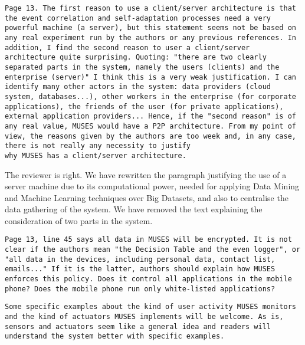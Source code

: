 \documentclass[preprint]{elsarticle}
\begin{document}
{\begin{verbatim}
Page 13. The first reason to use a client/server architecture is that
the event correlation and self-adaptation processes need a very
powerful machine (a server), but this statement seems not be based on
any real experiment run by the authors or any previous references. In
addition, I find the second reason to user a client/server
architecture quite surprising. Quoting: "there are two clearly
separated parts in the system, namely the users (clients) and the
enterprise (server)" I think this is a very weak justification. I can
identify many other actors in the system: data providers (cloud
system, databases...), other workers in the enterprise (for corporate
applications), the friends of the user (for private applications),
external application providers... Hence, if the "second reason" is of
any real value, MUSES would have a P2P architecture. From my point of
view, the reasons given by the authors are too week and, in any case,
there is not really any necessity to justify 
why MUSES has a client/server architecture.
\end{verbatim}

The reviewer is right. We have rewritten the paragraph justifying the
use of a server machine due to its computational power, needed for
applying Data Mining and Machine Learning techniques over Big
Datasets, and also to centralise the data gathering of the system. We
have removed the text explaining the consideration of two parts in the
system. 

\begin{verbatim}
Page 13, line 45 says all data in MUSES will be encrypted. It is not
clear if the authors mean "the Decision Table and the even logger", or
"all data in the devices, including personal data, contact list,
emails..." If it is the latter, authors should explain how MUSES
enforces this policy. Does it control all applications in the mobile
phone? Does the mobile phone run only white-listed applications? 
\end{verbatim}


\begin{verbatim}
Some specific examples about the kind of user activity MUSES monitors
and the kind of actuators MUSES implements will be welcome. As is,
sensors and actuators seem like a general idea and readers will
understand the system better with specific examples.
\end{verbatim}

}
\end{document}
